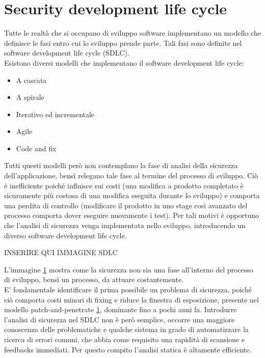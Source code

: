 \section{Security development life cycle}
Tutte le realtà che si occupano di sviluppo software implementano un modello che definisce le fasi entro cui lo sviluppo prende parte. Tali fasi sono definite nel software development life cycle (SDLC).\\
Esistono diversi modelli che implementano il software development life cycle:
\begin{itemize}
\item A cascata
\item A spirale
\item Iterativo ed incrementale
\item Agile
\item Code and fix
\end{itemize}
Tutti questi modelli però non contemplano la fase di analisi della sicurezza dell'applicazione, bensì relegano tale fase al termine del processo di sviluppo. Ciò è inefficiente poiché influisce sui costi (una modifica a prodotto completato è sicuramente più costosa di una modifica eseguita durante lo sviluppo) e comporta una perdita di controllo (modificare il prodotto in uno stage così avanzato del processo comporta dover eseguire nuovamente i test). Per tali motivi è opportuno che l'analisi di sicurezza venga implementata nello sviluppo, introducendo un diverso software development life cycle.

INSERIRE QUI IMMAGINE SDLC

L'immagine \ref{} mostra come la sicurezza non sia una fase all'interno del processo di sviluppo, bensì un processo, da attuare costantemente.\\
E' fondamentale identificare il prima possibile un problema di sicurezza, poiché ciò comporta costi minori di fixing e riduce la finestra di esposizione, presente nel modello patch-and-penetrate  \ref{}, dominante fino a pochi anni fa. 
Introdurre l'analisi di sicurezza nel SDLC non è però semplice, occorre una maggiore conoscenza delle problematiche e qualche sistema in grado di automatizzare la ricerca di errori comuni, che abbia come requisito una rapidità di scansione e feedbacks immediati. Per questo compito l'analisi statica è altamente efficiente.